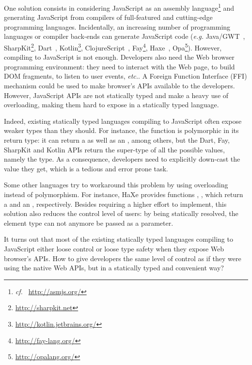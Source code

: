 \documentclass[runningheads,a4paper]{llncs}
\newcommand{\eg}{\emph{e.g.}}
\newcommand{\cf}{\emph{cf.~}}
\newcommand{\etc}{\emph{etc.}}
\begin{document}
One solution consists in considering JavaScript as an assembly language\footnote{\cf
\href{http://asmjs.org/}{http://asmjs.org/}} and generating JavaScript from compilers of
full-featured and cutting-edge programming languages. Incidentally, an increasing number of
programming languages or compiler back-ends can generate JavaScript code (\eg
Java/GWT~\cite{Chaganti07_GWT},
SharpKit\footnote{\href{http://sharpkit.net}{http://sharpkit.net}}, Dart~\cite{Griffith11_Dart},
Kotlin\footnote{\href{http://kotlin.jetbrains.org/}{http://kotlin.jetbrains.org/}},
ClojureScript~\cite{McGranaghan11_ClojureScript},
Fay\footnote{\href{http://fay-lang.org/}{http://fay-lang.org/}}, Haxe~\cite{Cannasse08_HaXe},
Opa\footnote{\href{http://opalang.org/}{http://opalang.org/}}). However, compiling to JavaScript is
not enough. Developers also need the Web browser programming environment: they need to interact with
the Web page, to build DOM fragments, to listen to user events, \etc. A Foreign Function
Interface (FFI) mechanism could be used to make browser’s APIs available to the developers. However,
JavaScript APIs are not statically typed and make a heavy use of overloading, making them hard to
expose in a statically typed language.

Indeed, existing statically typed languages compiling to JavaScript often expose weaker types than
they should. For instance, the function  is polymorphic in its return type: it
can return a  as well as an , among others, but the Dart, Fay,
SharpKit and Kotlin APIs return the super-type of all the possible values, namely the 
type. As a consequence, developers need to explicitly down-cast the value they get, which is a
tedious and error prone task.

Some other languages try to workaround this problem by using overloading instead of polymorphism.
For instance, HaXe provides functions , , which
return a  and an , respectively. Besides requiring a higher
effort to implement, this solution also reduces the control level of users: by being statically
resolved, the element type can not anymore be passed as a parameter.

It turns out that most of the existing statically typed languages compiling to JavaScript either
loose control or loose type safety when they expose Web browser’s APIs. How to give developers the
same level of control as if they were using the native Web APIs, but in a statically typed and
convenient way?
\end{document}

